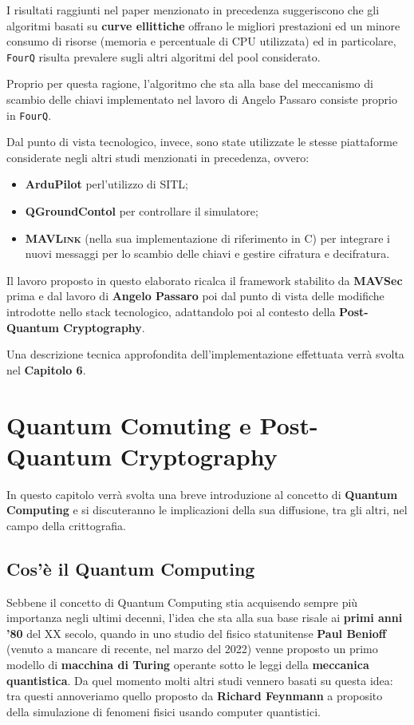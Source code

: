 \documentclass[a4paper, 12pt, oneside]{article}
\theoremstyle{definition}
\begin{document}
I risultati raggiunti nel paper menzionato in precedenza suggeriscono che gli algoritmi basati su \textbf{curve ellittiche} offrano le migliori prestazioni ed un minore consumo di risorse (memoria e percentuale di CPU utilizzata) ed in particolare, \texttt{FourQ} risulta prevalere sugli altri algoritmi del pool considerato.

Proprio per questa ragione, l'algoritmo che sta alla base del meccanismo di scambio delle chiavi implementato nel lavoro di Angelo Passaro consiste proprio in \texttt{FourQ}.

Dal punto di vista tecnologico, invece, sono state utilizzate le stesse piattaforme considerate negli altri studi menzionati in precedenza, ovvero:

\begin{itemize}
    \item \textbf{ArduPilot} perl'utilizzo di SITL;
    \item \textbf{QGroundContol} per controllare il simulatore;
    \item \textbf{\textsc{MAVLink}} (nella sua implementazione di riferimento in C) per integrare i nuovi messaggi per lo scambio delle chiavi e gestire cifratura e decifratura.
\end{itemize}

Il lavoro proposto in questo elaborato ricalca il framework stabilito da \textbf{MAVSec} prima e dal lavoro di \textbf{Angelo Passaro} poi dal punto di vista delle modifiche introdotte nello stack tecnologico, adattandolo poi al contesto della \textbf{Post-Quantum Cryptography}. 

Una descrizione tecnica approfondita dell'implementazione effettuata verrà svolta nel \textbf{Capitolo 6}.

\newpage
\section{Quantum Comuting e Post-Quantum Cryptography}
In questo capitolo verrà svolta una breve introduzione al concetto di \textbf{Quantum Computing} e si discuteranno le implicazioni della sua diffusione, tra gli altri, nel campo della crittografia.

\subsection{Cos'è il Quantum Computing}
Sebbene il concetto di Quantum Computing stia acquisendo sempre più importanza negli ultimi decenni, l'idea che sta alla sua base risale ai \textbf{primi anni '80} del XX secolo, quando in uno studio \cite{Benioff1980} del fisico statunitense \textbf{Paul Benioff} (venuto a mancare di recente, nel marzo del 2022) venne proposto un primo modello di \textbf{macchina di Turing} operante sotto le leggi della \textbf{meccanica quantistica}. Da quel momento molti altri studi vennero basati su questa idea: tra questi annoveriamo quello proposto da \textbf{Richard Feynmann} a proposito della simulazione di fenomeni fisici usando computer quantistici.
\end{document}
